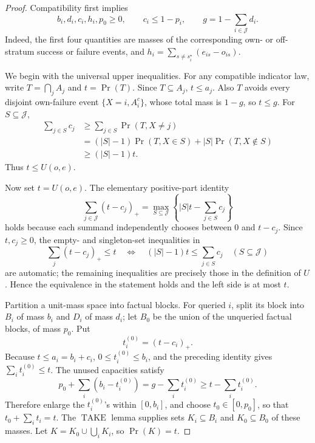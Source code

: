 \documentclass{article}
\begin{document}
\begin{proof}
Compatibility first implies
\[
 b_i,d_i,c_i,h_i,p_0\geq0,
 \qquad c_i\leq1-p_i,
 \qquad g=1-\sum_{i\in\mathcal J}d_i.
\]
Indeed, the first four quantities are masses of the corresponding own- or off-stratum success or failure events, and \(h_i=\sum_{s\ne s_i^\star}(e_{is}-o_{is})\).

We begin with the universal upper inequalities.  For any compatible indicator law, write \(T=\bigcap_jA_j\) and \(t=\Pr(T)\).  Since \(T\subseteq A_j\), \(t\leq a_j\).  Also \(T\) avoids every disjoint own-failure event \(\{X=i,A_i^c\}\), whose total mass is \(1-g\), so \(t\leq g\).  For \(S\subseteq\mathcal J\),
\[
 \begin{aligned}
 \sum_{j\in S}c_j
 &\geq\sum_{j\in S}\Pr(T,X\ne j)\\
 &=(|S|-1)\Pr(T,X\in S)+|S|\Pr(T,X\notin S)\\
 &\geq(|S|-1)t.
 \end{aligned}
\]
Thus \(t\leq U(o,e)\).

Now set \(t=U(o,e)\).  The elementary positive-part identity
\[
 \sum_{j\in\mathcal J}(t-c_j)_+
 =\max_{S\subseteq\mathcal J}
 \left\{|S|t-\sum_{j\in S}c_j\right\}
\]
holds because each summand independently chooses between \(0\) and \(t-c_j\).  Since \(t,c_j\geq0\), the empty- and singleton-set inequalities in
\[
 \sum_j(t-c_j)_+\leq t
 \quad\Longleftrightarrow\quad
 (|S|-1)t\leq\sum_{j\in S}c_j\quad(S\subseteq\mathcal J)
\]
are automatic; the remaining inequalities are precisely those in the definition of \(U\).  Hence the equivalence in the statement holds and the left side is at most \(t\).

Partition a unit-mass space into factual blocks.  For queried \(i\), split its block into \(B_i\) of mass \(b_i\) and \(D_i\) of mass \(d_i\); let \(B_0\) be the union of the unqueried factual blocks, of mass \(p_0\).  Put
\[
 t_i^{(0)}=(t-c_i)_+.
\]
Because \(t\leq a_i=b_i+c_i\), \(0\leq t_i^{(0)}\leq b_i\), and the preceding identity gives \(\sum_i t_i^{(0)}\leq t\).  The unused capacities satisfy
\[
 p_0+\sum_i(b_i-t_i^{(0)})
 =g-\sum_i t_i^{(0)}
 \geq t-\sum_i t_i^{(0)}.
\]
Therefore enlarge the \(t_i^{(0)}\)'s within \([0,b_i]\), and choose \(t_0\in[0,p_0]\), so that \(t_0+\sum_i t_i=t\).  The \(\operatorname{TAKE}\) lemma supplies sets \(K_i\subseteq B_i\) and \(K_0\subseteq B_0\) of these masses.  Let \(K=K_0\cup\bigcup_iK_i\), so \(\Pr(K)=t\).


\end{proof}
\end{document}

